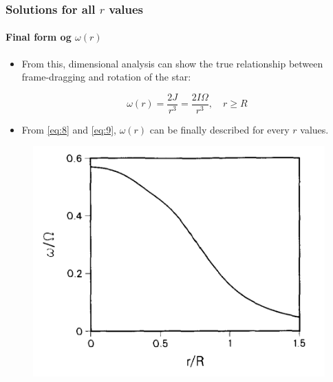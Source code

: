 \begin{frame}
\frametitle{Solutions for all $r$ values}
\framesubtitle{Final form og $\omega (r)$}

\begin{itemize}
	\item From this, dimensional analysis can show the true relationship between frame-dragging and rotation of the star:
	\begin{block}{}
		\begin{equation} \label{eq:9}
			\omega (r)
			=
			\frac{2 J}{r^{3}}
			=
			\frac{2 I \Omega}{r^{3}}, \quad r \geq R
		\end{equation}
	\end{block}
	\item From \eqref{eq:8} and \eqref{eq:9}, $\omega (r)$ can be finally described for every $r$ values.
\end{itemize}
\begin{figure}
	\centering
	\includegraphics[width=0.45\linewidth]{./images/ns-omega.png}
\end{figure}

\end{frame}
